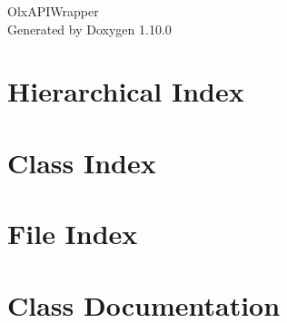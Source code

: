 \documentclass[twoside]{book}
\newcommand{\+}{\discretionary{\mbox{\scriptsize$\hookleftarrow$}}{}{}}
\newcommand{\clearemptydoublepage}{%
    \newpage{\pagestyle{empty}\cleardoublepage}%
  }
\begin{document}
  \raggedbottom

  



    \hypersetup{pageanchor=false,
                bookmarksnumbered=true,
                pdfencoding=unicode
               }


  \begin{titlepage}
  \vspace*{7cm}
  \begin{center}%
  {\Large Olx\+APIWrapper}\\

  \vspace*{1cm}
  {\large Generated by Doxygen 1.10.0}\\

  \end{center}
  \end{titlepage}


  \clearemptydoublepage


  \tableofcontents

  \clearemptydoublepage




  \hypersetup{pageanchor=true}





\chapter{Hierarchical Index}

\chapter{Class Index}

\chapter{File Index}

\chapter{Class Documentation}




















\end{document}
